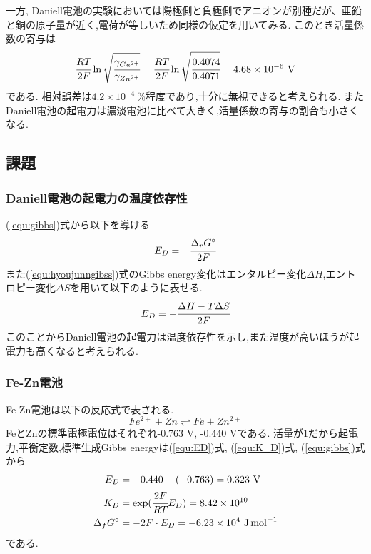 
一方, Daniell電池の実験においては陽極側と負極側でアニオンが別種だが、亜鉛と銅の原子量が近く,電荷が等しいため同様の仮定を用いてみる.
このとき活量係数の寄与は
\begin{equation*}
  \cfrac{RT}{2F} \ln \sqrt{\cfrac{\gamma_{Cu^{2+}}}{\gamma_{Zn^{2+}}}}=\cfrac{RT}{2F} \ln \sqrt{\cfrac{0.4074}{0.4071}}=4.68\times10^{-6}\ \si{\volt}
\end{equation*}
である.
相対誤差は$4.2\times10^{-4}\ \%$程度であり,十分に無視できると考えられる.
またDaniell電池の起電力は濃淡電池に比べて大きく,活量係数の寄与の割合も小さくなる.
\subsection{課題}
\subsubsection{Daniell電池の起電力の温度依存性}
(\ref{equ:gibbs})式から以下を導ける
\begin{equation}
  \label{equ:hyoujunngibss}
  E_D=-\cfrac{\Delta_rG^{\circ}}{2F}
\end{equation}
また(\ref{equ:hyoujunngibss})式のGibbs energy変化はエンタルピー変化$\Delta H$,エントロピー変化$\Delta S$を用いて以下のように表せる\cite{jiten}.
\begin{equation}
  \label{equ:enen}
  E_D=-\cfrac{\Delta H - T\Delta S}{2F}
\end{equation}
このことからDaniell電池の起電力は温度依存性を示し,また温度が高いほうが起電力も高くなると考えられる.
\subsubsection{Fe-Zn電池}
Fe-Zn電池は以下の反応式で表される.
\begin{equation*}
  Fe^{2+}+Zn\rightleftharpoons Fe+Zn^{2+}
\end{equation*}
FeとZnの標準電極電位はそれぞれ-0.763 \si{\volt}, -0.440 \si{\volt}である.
活量が1だから起電力,平衡定数,標準生成Gibbs energyは(\ref{equ:ED})式, (\ref{equ:K_D})式, (\ref{equ:gibbs})式から
\begin{align*}
  E_D&=-0.440-(-0.763)=0.323\ \si{\volt}\\
  K_D&=\exp(\cfrac{2F}{RT}E_D)=8.42\times10^{10}\\
  \Delta_fG^{\circ}&=-2F\cdot E_D=-6.23\times10^4\ \si{\joule.\mole^{-1}}
\end{align*}
である.

